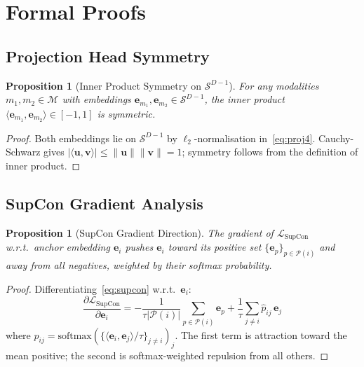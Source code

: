 \documentclass[10pt,conference]{IEEEtran}
\theoremstyle{ieeethm}
\newtheorem{proposition}[theorem]{Proposition}
\theoremstyle{ieeedef}
\theoremstyle{ieeeremark}
\begin{document}
\appendix
\section{Formal Proofs}
\label{app:proofs}

\subsection{Projection Head Symmetry}

\begin{proposition}[Inner Product Symmetry on $\mathcal{S}^{D-1}$]
\label{prop:symmetry}
For any modalities $m_1, m_2 \in \mathcal{M}$ with embeddings $\mathbf{e}_{m_1}, \mathbf{e}_{m_2} \in \mathcal{S}^{D-1}$, the inner product $\langle\mathbf{e}_{m_1}, \mathbf{e}_{m_2}\rangle \in [-1,1]$ is symmetric.
\end{proposition}
\begin{proof}
Both embeddings lie on $\mathcal{S}^{D-1}$ by $\ell_2$-normalisation in~\eqref{eq:proj4}. Cauchy-Schwarz gives $|\langle\mathbf{u},\mathbf{v}\rangle| \leq \|\mathbf{u}\|\|\mathbf{v}\| = 1$; symmetry follows from the definition of inner product.
\end{proof}

\subsection{SupCon Gradient Analysis}

\begin{proposition}[SupCon Gradient Direction]
\label{prop:supcon_grad}
The gradient of $\mathcal{L}_{\text{SupCon}}$ w.r.t.\ anchor embedding $\mathbf{e}_i$ pushes $\mathbf{e}_i$ toward its positive set $\{\mathbf{e}_p\}_{p \in \mathcal{P}(i)}$ and away from all negatives, weighted by their softmax probability.
\end{proposition}
\begin{proof}
Differentiating~\eqref{eq:supcon} w.r.t.\ $\mathbf{e}_i$:
\[
\frac{\partial \mathcal{L}_\text{SupCon}}{\partial \mathbf{e}_i} =
-\frac{1}{\tau|\mathcal{P}(i)|}\sum_{p \in \mathcal{P}(i)}\mathbf{e}_p
+\frac{1}{\tau}\sum_{j \neq i} \hat{p}_{ij}\,\mathbf{e}_j
\]
where $\hat{p}_{ij} = \text{softmax}(\{\langle\mathbf{e}_i,\mathbf{e}_j\rangle/\tau\}_{j\neq i})_j$. The first term is attraction toward the mean positive; the second is softmax-weighted repulsion from all others.
\end{proof}
\end{document}
